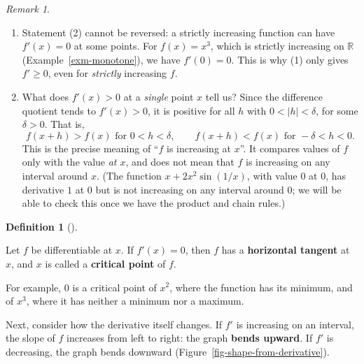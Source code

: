 \documentclass[
  letterpaper,
  DIV=11,
  numbers=noendperiod]{scrreprt}
\providecommand{\tightlist}{%
  \setlength{\itemsep}{0pt}\setlength{\parskip}{0pt}}
\theoremstyle{plain}
\theoremstyle{plain}
\theoremstyle{definition}
\newtheorem{definition}{Definition}[chapter]
\theoremstyle{definition}
\theoremstyle{definition}
\theoremstyle{plain}
\theoremstyle{plain}
\theoremstyle{remark}
\newtheorem{refremark}{Remark}[chapter]
\begin{document}
\begin{refremark}
\leavevmode

\begin{enumerate}
\def\labelenumi{\arabic{enumi}.}
\tightlist
\item
  Statement (2) cannot be reversed: a strictly increasing function can
  have \(f'(x)=0\) at some points. For \(f(x)=x^3\), which is strictly
  increasing on \(\mathbb{R}\) (Example~\ref{exm-monotone}), we have
  \(f'(0)=0\). This is why (1) only gives \(f'\ge 0\), even for
  \emph{strictly} increasing \(f\).
\item
  What does \(f'(x)>0\) at a \emph{single} point \(x\) tell us? Since
  the difference quotient tends to \(f'(x)>0\), it is positive for all
  \(h\) with \(0<\lvert h \rvert<\delta\), for some \(\delta>0\). That
  is, \[
  f(x+h) > f(x) \text{ for } 0<h<\delta, \qquad f(x+h)<f(x) \text{ for } -\delta<h<0 .
  \] This is the precise meaning of ``\(f\) is increasing at \(x\)''. It
  compares values of \(f\) only with the value \emph{at \(x\)}, and does
  not mean that \(f\) is increasing on any interval around \(x\). (The
  function \(x+2x^2\sin(1/x)\), with value \(0\) at \(0\), has
  derivative \(1\) at \(0\) but is not increasing on any interval around
  \(0\); we will be able to check this once we have the product and
  chain rules.)
\end{enumerate}

\label{rem-monotone-derivative}

\end{refremark}

\begin{definition}[]\protect\hypertarget{def-critical-point}{}\label{def-critical-point}

\hfill\break
Let \(f\) be differentiable at \(x\). If \(f'(x)=0\), then \(f\) has a
\textbf{horizontal tangent} at \(x\), and \(x\) is called a
\textbf{critical point} of \(f\).

\end{definition}

For example, \(0\) is a critical point of \(x^2\), where the function
has its minimum, and of \(x^3\), where it has neither a minimum nor a
maximum.

Next, consider how the derivative itself changes. If \(f'\) is
increasing on an interval, the slope of \(f\) increases from left to
right: the graph \textbf{bends upward}. If \(f'\) is decreasing, the
graph bends downward (Figure~\ref{fig-shape-from-derivative}).
\end{document}
